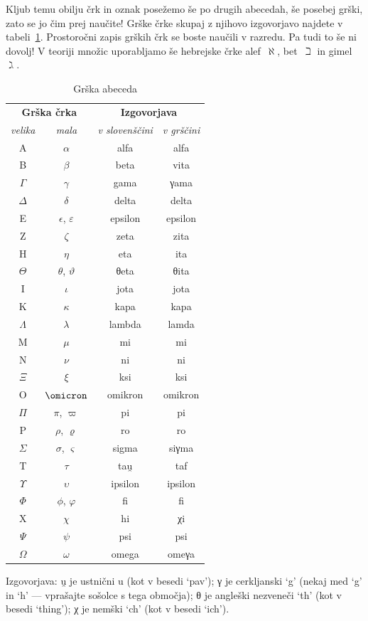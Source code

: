 Kljub temu obilju črk in oznak posežemo še po drugih abecedah, še posebej grški, zato se
jo čim prej naučite! Grške črke skupaj z njihovo izgovorjavo najdete v
tabeli~\ref{tabela:grska-abeceda}. Prostoročni zapis grških črk se boste naučili v
razredu.
%
Pa tudi to še ni dovolj! V teoriji množic uporabljamo še hebrejske črke
alef~$\aleph$, bet~$\beth$ in gimel~$\gimel$.

\begin{table}[ht]
\begin{center}
\begin{tabular}{cc|cc}
\multicolumn{2}{c|}{\textbf{Grška črka}} & \multicolumn{2}{c}{\textbf{Izgovorjava}} \\
\textit{velika} & \textit{mala} & \textit{v slovenščini} & \textit{v grščini} \\
\hline
A & $\alpha$ & alfa & alfa \\
B & $\beta$ & beta & vita \\
$\Gamma$ & $\gamma$ & gama & γama \\
$\Delta$ & $\delta$ & delta & delta \\
E & $\epsilon$, $\varepsilon$ & epsilon & epsilon \\
Z & $\zeta$ & zeta & zita \\
H & $\eta$ & eta & ita \\
$\Theta$ & $\theta$, $\vartheta$ & θeta & θita \\
I & $\iota$ & jota & jota \\
K & $\kappa$ & kapa & kapa \\
$\Lambda$ & $\lambda$ & lambda & lamda \\
M & $\mu$ & mi & mi \\
N & $\nu$ & ni & ni \\
$\Xi$ & $\xi$ & ksi & ksi \\
O & $\omicron$ & omikron & omikron \\
$\Pi$ & $\pi$, $\varpi$ & pi & pi \\
P & $\rho$, $\varrho$ & ro & ro \\
$\Sigma$ & $\sigma$, $\varsigma$ & sigma & siγma \\
T & $\tau$ & tau̯ & taf \\
$\Upsilon$ & $\upsilon$ & ipsilon & ipsilon \\
$\Phi$ & $\phi$, $\varphi$ & fi & fi \\
X & $\chi$ & hi & χi \\
$\Psi$ & $\psi$ & psi & psi \\
$\Omega$ & $\omega$ & omega & omeγa \\
\end{tabular}
\end{center}
\par\medskip
\footnotesize{
Izgovorjava: u̯ je ustnični u (kot v besedi `pav');
γ je cerkljanski `g' (nekaj med `g' in `h' --- vprašajte sošolce s tega območja);
θ je angleški nezveneči `th' (kot v besedi `thing');
χ je nemški `ch' (kot v besedi `ich').}
\caption{Grška abeceda}
\label{tabela:grska-abeceda}
\end{table}

